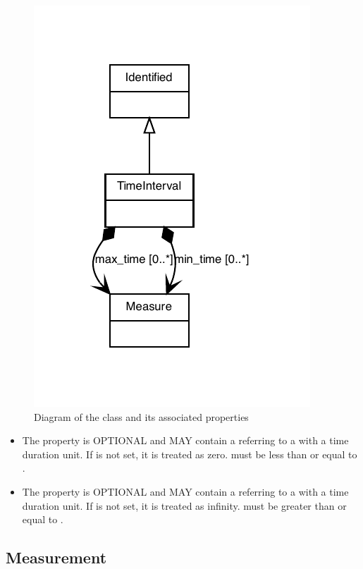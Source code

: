 \begin{figure}[ht]
\begin{center}
\includegraphics[scale=0.8]{figures/TimeInterval}
\caption[]{Diagram of the  class and its associated properties}
\label{uml:TimeInterval}
\end{center}
\end{figure}

\begin{itemize}
\item \label{sec:minTime}
The  property is OPTIONAL and MAY contain a  referring to a  with a time duration unit.
If  is not set, it is treated as zero.
 must be less than or equal to .

\item \label{sec:maxTime}
The  property is OPTIONAL and MAY contain a  referring to a  with a time duration unit.
If  is not set, it is treated as infinity.
 must be greater than or equal to .
\end{itemize}


\subsection{Measurement}
\label{sec:Measurement}

